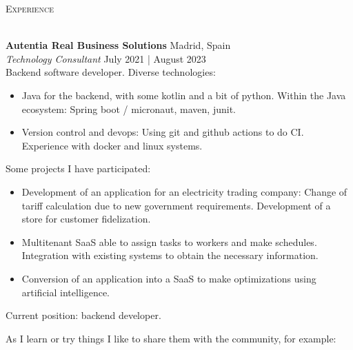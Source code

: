 \documentclass[a4paper]{article}
\newcommand{\lineunder} {
    \vspace*{-8pt} \\
    \hspace*{-18pt} \hrulefill \\
}
\newcommand{\header} [1] {
    {\hspace*{-18pt}\vspace*{6pt} \textsc{#1}}
    \vspace*{-6pt} \lineunder
}
\begin{document}
\header{Experience}
\vspace{1mm}

\textbf{Autentia Real Business Solutions} \hfill Madrid, Spain\\
\textit{Technology Consultant} \hfill July 2021 | August 2023\\
\vspace{-1mm}
Backend software developer. Diverse technologies:

\begin{itemize} \itemsep 1pt
\item Java for the backend, with some kotlin and a bit of python. Within the Java ecosystem: Spring boot / micronaut, maven, junit.
\item Version control and devops: Using git and github actions to do CI. Experience with docker and linux systems.
\end{itemize}

Some projects I have participated:

\begin{itemize} \itemsep 1pt

\item Development of an application for an electricity trading company: Change of tariff calculation due to new government requirements. Development of a store for customer fidelization.
\item Multitenant SaaS able to assign tasks to workers and make schedules. Integration with existing systems to obtain the necessary information.
\item Conversion of an application into a SaaS to make optimizations using artificial intelligence.
\end{itemize}

Current position: backend developer.

As I learn or try things I like to share them with the community, for example:
\end{document}
